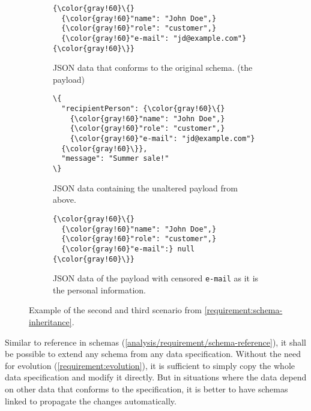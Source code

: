 \begin{figure}[h!]\centering
  \begin{subfigure}{\textwidth}
  \begin{Verbatim}[commandchars=\\\{\}]
{\color{gray!60}\{}
  {\color{gray!60}"name": "John Doe",}
  {\color{gray!60}"role": "customer",}
  {\color{gray!60}"e-mail": "jd@example.com"}
{\color{gray!60}\}}
    \end{Verbatim}
    \caption{JSON data that conforms to the original schema. (the payload)}
  \end{subfigure}


  \begin{subfigure}[b]{.45\textwidth}

    \begin{Verbatim}[commandchars=\\\{\}]
\{
  "recipientPerson": {\color{gray!60}\{}
    {\color{gray!60}"name": "John Doe",}
    {\color{gray!60}"role": "customer",}
    {\color{gray!60}"e-mail": "jd@example.com"}
  {\color{gray!60}\}},
  "message": "Summer sale!"
\}
    \end{Verbatim}
    \caption{JSON data containing the unaltered payload from above.}
    \label{fig:schema-inheritance:json-data-unaltered}
  \end{subfigure}\hfill%
  \begin{subfigure}[b]{.45\textwidth}
    \begin{Verbatim}[commandchars=\\\{\}]
{\color{gray!60}\{}
  {\color{gray!60}"name": "John Doe",}
  {\color{gray!60}"role": "customer",}
  {\color{gray!60}"e-mail":} null
{\color{gray!60}\}}
    \end{Verbatim}
    \caption{JSON data of the payload with censored {\tt e-mail} as it is the personal information.}
    \label{fig:schema-inheritance:json-data-censored}
    \end{subfigure}%
  \caption{Example of the second and third scenario from \autoref{requirement:schema-inheritance}.}
\end{figure}

Similar to reference in schemas (\autoref{analysis/requirement/schema-reference}), it shall be possible to extend any schema from any data specification. Without the need for evolution (\autoref{requirement:evolution}), it is sufficient to simply copy the whole data specification and modify it directly. But in situations where the data depend on other data that conforms to the specification, it is better to have schemas linked to propagate the changes automatically.

